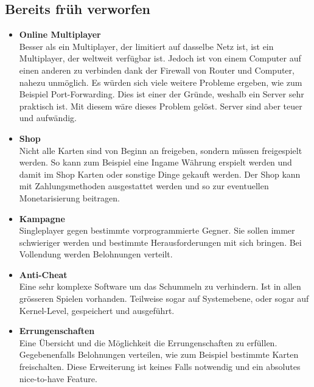 \subsection{Bereits früh verworfen}
\begin{itemize}
    \item \textbf{Online Multiplayer} \\
        Besser als ein Multiplayer, der limitiert auf dasselbe Netz ist, ist ein Multiplayer, der weltweit verfügbar ist. Jedoch ist von einem Computer auf einen anderen zu
        verbinden dank der Firewall von Router und Computer, nahezu unmöglich. Es würden sich viele weitere Probleme ergeben, wie zum Beispiel Port-Forwarding. Dies ist einer der Gründe, weshalb ein Server sehr praktisch ist. Mit diesem wäre dieses
        Problem gelöst. Server sind aber teuer und aufwändig. 
    \item \textbf{Shop} \\
        Nicht alle Karten sind von Beginn an freigeben, sondern müssen freigespielt werden.
        So kann zum Beispiel eine Ingame Währung erspielt werden und damit im Shop Karten oder sonstige Dinge gekauft werden.
        Der Shop kann mit Zahlungsmethoden ausgestattet werden und so zur eventuellen Monetarisierung beitragen.
    \item \textbf{Kampagne} \\
        Singleplayer gegen bestimmte vorprogrammierte Gegner. Sie sollen immer schwieriger werden und bestimmte Herausforderungen mit sich bringen.
        Bei Vollendung werden Belohnungen verteilt.
    \item \textbf{Anti-Cheat} \\
        Eine sehr komplexe Software um das Schummeln zu verhindern. Ist in allen grösseren Spielen vorhanden. Teilweise sogar auf Systemebene, oder sogar auf Kernel-Level,
        gespeichert und ausgeführt.
    \item \textbf{Errungenschaften} \\
        Eine Übersicht und die Möglichkeit die Errungenschaften zu erfüllen.
        Gegebenenfalls Belohnungen verteilen, wie zum Beispiel bestimmte Karten freischalten.
        Diese Erweiterung ist keines Falls notwendig und ein absolutes nice-to-have Feature.
\end{itemize}

